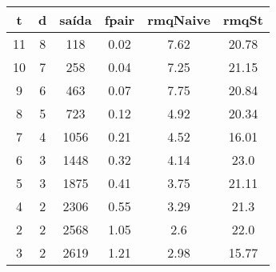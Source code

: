 \begin{tabular}{|c|c|c|c|c|c|}
\hline
\textbf{t} & \textbf{d} & \textbf{saída} & \textbf{fpair} & \textbf{rmqNaive} & \textbf{rmqSt}\\
\hline
11 & 8 & 118 & 0.02 & 7.62 & 20.78\\
\hline
10 & 7 & 258 & 0.04 & 7.25 & 21.15\\
\hline
9 & 6 & 463 & 0.07 & 7.75 & 20.84\\
\hline
8 & 5 & 723 & 0.12 & 4.92 & 20.34\\
\hline
7 & 4 & 1056 & 0.21 & 4.52 & 16.01\\
\hline
6 & 3 & 1448 & 0.32 & 4.14 & 23.0\\
\hline
5 & 3 & 1875 & 0.41 & 3.75 & 21.11\\
\hline
4 & 2 & 2306 & 0.55 & 3.29 & 21.3\\
\hline
2 & 2 & 2568 & 1.05 & 2.6 & 22.0\\
\hline
3 & 2 & 2619 & 1.21 & 2.98 & 15.77\\
\hline
\end{tabular}
